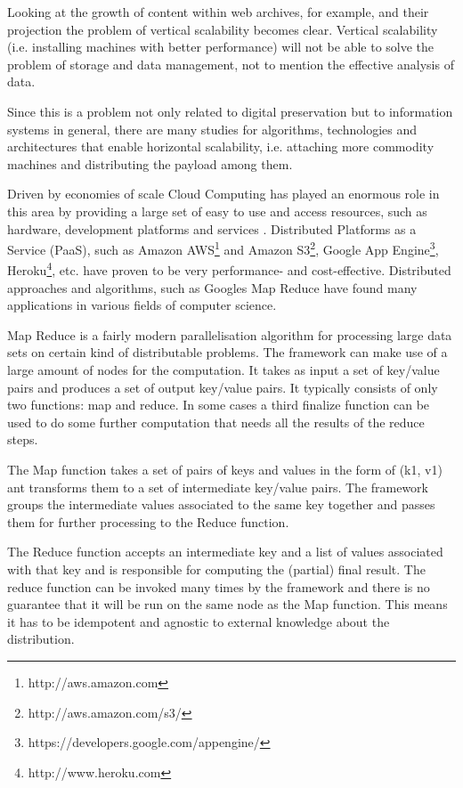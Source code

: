 Looking at the growth of content within web archives, for example, and their projection the problem of vertical scalability becomes clear. Vertical scalability (i.e. installing machines with better performance) will not be able to solve the problem of storage and data management, not to mention the effective analysis of data.

Since this is a problem not only related to digital preservation but to information systems in general, there are many studies for algorithms, technologies and architectures that enable horizontal scalability, i.e. attaching more commodity machines and distributing the payload among them.

Driven by economies of scale Cloud Computing has played an enormous role in this area by providing a large set of easy to use and access resources, such as hardware, development platforms and services \cite{Vaquero:2008, 4738445}. Distributed Platforms as a Service (PaaS), such as Amazon AWS\footnote{http://aws.amazon.com} and Amazon S3\footnote{http://aws.amazon.com/s3/}, Google App Engine\footnote{https://developers.google.com/appengine/}, Heroku\footnote{http://www.heroku.com}, etc. have proven to be very performance- and cost-effective. Distributed approaches and algorithms, such as Googles Map Reduce \cite{Dean:2008:MSD:1327452.1327492} have found many applications in various fields of computer science. 

Map Reduce is a fairly modern parallelisation algorithm for processing large data sets on certain kind of distributable problems. The framework can make use of a large amount of nodes for the computation. It takes as input a set of key/value pairs and produces a set of output key/value pairs. It typically consists of only two functions: map and reduce. In some cases a third finalize function can be used to do some further computation that needs all the results of the reduce steps.

The Map function takes a set of pairs of keys and values in the form of (k1, v1) ant transforms them to a set of intermediate key/value pairs. The framework groups the intermediate values associated to the same key together and passes them for further processing to the Reduce function.

The Reduce function accepts an intermediate key and a list of values associated with that key and is responsible for computing the (partial) final result. The reduce function can be invoked many times by the framework and there is no guarantee that it will be run on the same node as the Map function. This means it has to be idempotent and agnostic to external knowledge about the distribution.

